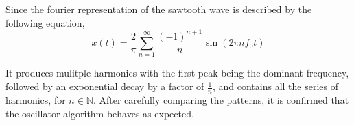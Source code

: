 

Since the fourier representation of the sawtooth wave is described by the following equation,
\begin{equation}\label{eq:sawtooth_fourier}
    x(t) = \frac{2}{\pi}\sum_{n=1}^{\infty} \frac{(-1)^{n+1}}{n}\sin(2\pi n f_0 t)
\end{equation}

It produces mulitple harmonics with the first peak being the dominant frequency,
followed by an exponential decay by a factor of $\frac{1}{n}$, and contains all the
series of harmonics, for $n \in \mathbb{N}$. After carefully comparing the patterns, 
it is confirmed that the oscillator algorithm behaves as 
expected.
